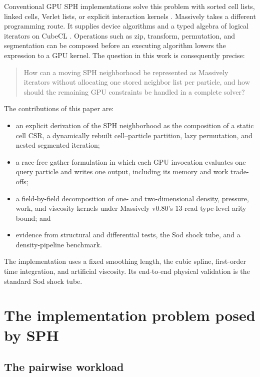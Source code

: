 \documentclass[a4paper,10pt]{article}
\begin{document}
Conventional GPU SPH implementations solve this problem with sorted cell lists,
linked cells, Verlet lists, or explicit interaction kernels
\citep{herault2010,dominguez2011,dominguez2013,winkler2018}.  Massively takes a
different programming route.  It supplies device algorithms and a typed algebra
of logical iterators on CubeCL \citep{massively080,cubecl}.  Operations such as
zip, transform, permutation, and segmentation can be composed before an
executing algorithm lowers the expression to a GPU kernel.  The question in
this work is consequently precise:

\begin{quote}
How can a moving SPH neighborhood be represented as Massively iterators without
allocating one stored neighbor list per particle, and how should the remaining
GPU constraints be handled in a complete solver?
\end{quote}

The contributions of this paper are:
\begin{itemize}
  \item an explicit derivation of the SPH neighborhood as the composition of a
        static cell CSR, a dynamically rebuilt cell--particle partition, lazy
        permutation, and nested segmented iteration;
  \item a race-free gather formulation in which each GPU invocation evaluates
        one query particle and writes one output, including its memory and work
        trade-offs;
  \item a field-by-field decomposition of one- and two-dimensional density,
        pressure, work, and viscosity kernels under Massively v0.80's 13-read
        type-level arity bound; and
  \item evidence from structural and differential tests, the Sod shock tube,
        and a density-pipeline benchmark.
\end{itemize}

The implementation uses a fixed smoothing length, the cubic spline,
first-order time integration, and artificial viscosity.  Its end-to-end
physical validation is the standard Sod shock tube.

\section{The implementation problem posed by SPH}

\subsection{The pairwise workload}
\end{document}
